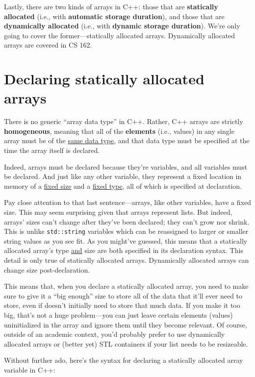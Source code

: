 \documentclass{article}
\begin{document}
Lastly, there are two kinds of arrays in C++: those that are \textbf{statically allocated} (i.e., with \textbf{automatic storage duration}), and those that are \textbf{dynamically allocated} (i.e., with \textbf{dynamic storage duration}). We're only going to cover the former---statically allocated arrays. Dynamically allocated arrays are covered in CS 162.

\section{Declaring statically allocated arrays}

There is no generic ``array data type'' in C++. Rather, C++ arrays are strictly \textbf{homogeneous}, meaning that all of the \textbf{elements} (i.e., values) in any single array must be of the \ul{same data type}, and that data type must be specified at the time the array itself is declared.

Indeed, arrays must be declared because they're variables, and all variables must be declared. And just like any other variable, they represent a fixed location in memory of a \ul{fixed size} and a \ul{fixed type}, all of which is specified at declaration.

Pay close attention to that last sentence---arrays, like other variables, have a fixed size. This may seem surprising given that arrays represent lists. But indeed, arrays' sizes can't change after they've been declared; they can't grow nor shrink. This is unlike \texttt{std::string} variables which can be reassigned to larger or smaller string values as you see fit. As you might've guessed, this means that a statically allocated array's type \ul{and} size are both specified in its declaration syntax. This detail is only true of statically allocated arrays. Dynamically allocated arrays can change size post-declaration.

This means that, when you declare a statically allocated array, you need to make sure to give it a ``big enough'' size to store all of the data that it'll ever need to store, even if doesn't initially need to store that much data. If you make it too big, that's not a huge problem---you can just leave certain elements (values) uninitialized in the array and ignore them until they become relevant. Of course, outside of an academic context, you'd probably prefer to use dynamically allocated arrays or (better yet) STL containers if your list needs to be resizeable.

Without further ado, here's the syntax for declaring a statically allocated array variable in C++:
\end{document}
